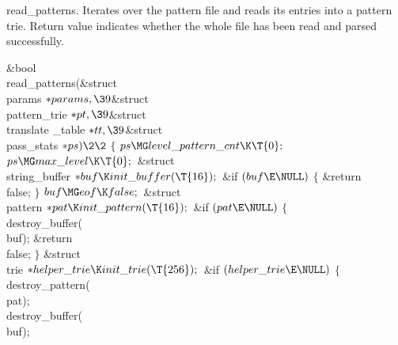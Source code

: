 \fi

read\_patterns.
Iterates over the pattern file and reads its entries into a pattern trie.
Return value indicates whether the whole file
has been read and parsed successfully.

\Y\B\1\1\&{bool} \\{read\_patterns}(\&{struct} \\{params} ${}{*}\\{params},%
\39{}$\&{struct} \\{pattern\_trie} ${}{*}\\{pt},\39{}$\&{struct} \\{translate%
\_table} ${}{*}\\{tt},\39{}$\&{struct} \\{pass\_stats} ${}{*}\\{ps})\2\2{}$\6
${}\{{}$\1\6
${}\\{ps}\MG\\{level\_pattern\_cnt}\K\T{0};{}$\6
${}\\{ps}\MG\\{max\_level}\K\T{0};{}$\7
\&{struct} \\{string\_buffer} ${}{*}\\{buf}\K\\{init\_buffer}(\T{16});{}$\7
\&{if} ${}(\\{buf}\E\NULL){}$\5
${}\{{}$\1\6
\&{return} \\{false};\6
\4${}\}{}$\2\6
${}\\{buf}\MG\\{eof}\K\\{false};{}$\7
\&{struct} \\{pattern} ${}{*}\\{pat}\K\\{init\_pattern}(\T{16});{}$\7
\&{if} ${}(\\{pat}\E\NULL){}$\5
${}\{{}$\1\6
\\{destroy\_buffer}(\\{buf});\6
\&{return} \\{false};\6
\4${}\}{}$\2\7
\&{struct} \\{trie} ${}{*}\\{helper\_trie}\K\\{init\_trie}(\T{256});{}$\7
\&{if} ${}(\\{helper\_trie}\E\NULL){}$\5
${}\{{}$\1\6
\\{destroy\_pattern}(\\{pat});\6
\\{destroy\_buffer}(\\{buf});\6
